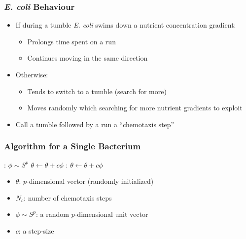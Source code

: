 \documentclass{beamer}
\begin{document}
\begin{frame}
\frametitle{\textit{\textit{E. coli}} Behaviour}
\begin{itemize}
  \item<1-> If during a tumble \textit{\textit{E. coli}} swims down a nutrient concentration gradient:
  \begin{itemize}
    \item<1-> Prolongs time spent on a run
    \item<1-> Continues moving in the same direction
  \end{itemize}
  \item<2-> Otherwise:
  \begin{itemize}
    \item<2-> Tends to switch to a tumble (search for more)
    \item<2-> Moves randomly which searching for more nutrient gradients to exploit
  \end{itemize}
  \item<3-> Call a tumble followed by a run a ``chemotaxis step''
\end{itemize}
\end{frame}

\begin{frame}
\frametitle{Algorithm for a Single Bacterium}
\begin{algorithmic}[1]
:
  \State $\phi \sim S^p$
  \State $\theta \gets \theta + c \phi$
  :
    \State $\theta \gets \theta + c \phi$
  \EndWhile
\EndFor
\end{algorithmic}
\begin{itemize}
  \item $\theta$: $p$-dimensional vector (randomly initialized)
  \item $N_c$: number of chemotaxis steps
  \item $\phi \sim S^p$: a random $p$-dimensional unit vector
  \item $c$: a step-size
\end{itemize}
\end{frame}
\end{document}
